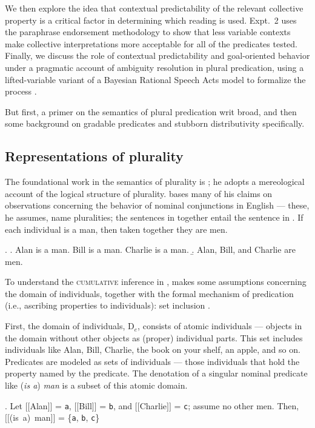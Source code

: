 \documentclass[linguex]{sp}
\newcommand{\sem}[1]{\mbox{$[\![$#1$]\!]$}}
\begin{document}
We then explore the idea that contextual predictability of the relevant collective property is a critical factor in determining which reading is used. Expt.~2 uses the paraphrase endorsement methodology to show that less variable contexts make collective interpretations more acceptable for all of the predicates tested. Finally, we discuss the role of contextual predictability and goal-oriented behavior under a pragmatic account of ambiguity resolution in plural predication, using a lifted-variable variant of a Bayesian Rational Speech Acts model to formalize the process \citep{frankgoodman2012,lassitergoodman2013}.

But first, a primer on the semantics of plural predication writ broad, and then some background on gradable predicates and stubborn distributivity specifically.

\subsection{Representations of plurality}

The foundational work in the semantics of plurality is \cite{link1983}; he adopts a mereological account of the logical structure of plurality. \citeauthor{link1983} bases many of his claims on observations concerning the behavior of nominal conjunctions in English --- these, he assumes, name pluralities; the sentences in \Next[a] together entail the sentence in \Next[b]. If each individual is a man, then taken together they are men.

\ex. \label{cumulative}\a. Alan is a man. Bill is a man. Charlie is a man.
\b. Alan, Bill, and Charlie are men.

To understand the \textsc{cumulative} inference in \Last, \citeauthor{link1983} makes some assumptions concerning the domain of individuals, together with the formal mechanism of predication (i.e., ascribing properties to individuals): set inclusion \citep[cf.][]{montague1973}.

First, the domain of individuals, D$_{e}$, consists of atomic individuals --- objects in the domain without other objects as (proper) individual parts. This set includes individuals like Alan, Bill, Charlie, the book on your shelf, an apple, and so on. Predicates are modeled as sets of individuals --- those individuals that hold the property named by the predicate. The denotation of a singular nominal predicate like (\emph{is a}) \emph{man} is a subset of this atomic domain.

\ex. \label{theboys} Let \sem{Alan} = \texttt{a}, \sem{Bill} = \texttt{b}, and \sem{Charlie} = \texttt{c}; assume no other men. Then,\\
 \sem{(is a) man} = \{\texttt{a}, \texttt{b}, \texttt{c}\}
\end{document}

